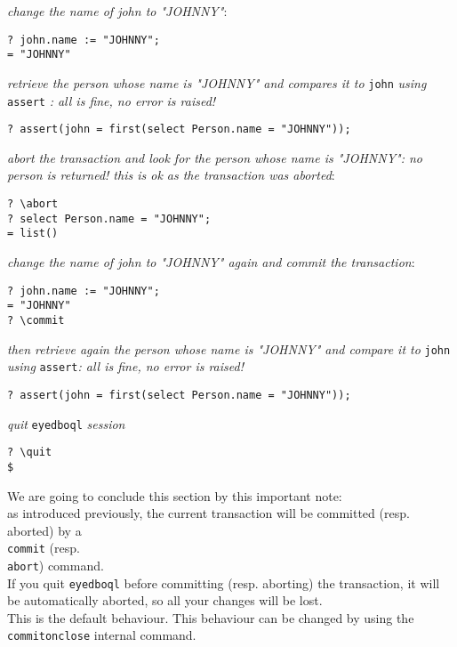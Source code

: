 \emph{change the name of john to "JOHNNY"}:
\begin{verbatim}
? john.name := "JOHNNY";
= "JOHNNY"
\end{verbatim}
\emph{retrieve the person whose name is "JOHNNY" and compares it to}
\texttt{john} \emph{using} \texttt{assert}
\emph{: all is fine, no error is raised!}
\begin{verbatim}
? assert(john = first(select Person.name = "JOHNNY"));
\end{verbatim}
\emph{abort the transaction and look for the person whose name is
"JOHNNY": no person is returned! this is ok as the transaction was aborted}:
\begin{verbatim}
? \abort
? select Person.name = "JOHNNY";
= list()
\end{verbatim}
\emph{change the name of john to "JOHNNY" again and commit the transaction}:
\begin{verbatim}
? john.name := "JOHNNY";
= "JOHNNY"
? \commit
\end{verbatim}
\emph{then retrieve again the person whose name is "JOHNNY" and compare
it to} \texttt{john} \emph{using}
\texttt{assert}\emph{: all is fine, no error is raised!}
\begin{verbatim}
? assert(john = first(select Person.name = "JOHNNY"));
\end{verbatim}
\emph{quit} \texttt{eyedboql} \emph{session}
\begin{verbatim}
? \quit
$
\end{verbatim}
We are going to conclude this section by this important note:\\
as introduced previously,
the current transaction will be committed (resp. aborted) by a \texttt{\\commit}
(resp. \texttt{\\abort}) command.
\\
If you quit \texttt{eyedboql} before committing (resp. aborting) the transaction,
it will be automatically aborted, so all your changes will be lost.
\\
This is the default behaviour. This behaviour can be changed by using the
\texttt{\\commitonclose} internal command.


